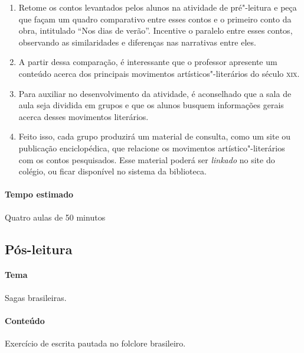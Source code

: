 \documentclass[12pt]{extarticle}
\begin{document}
\begin{enumerate}

\item  Retome os contos levantados pelos alunos na atividade de pré"-leitura e peça que
façam um quadro comparativo entre esses contos e o primeiro conto da obra,
intitulado ``Nos dias de verão''. Incentive o
paralelo entre esses contos, observando as
similaridades e diferenças nas narrativas entre eles.

\item A partir dessa comparação, é interessante que o professor apresente um conteúdo
acerca dos principais movimentos artísticos"-literários do século \textsc{xix}.

\item Para auxiliar no desenvolvimento da
atividade, é aconselhado que a sala de aula seja dividida em grupos e
que os alunos busquem informações gerais acerca desses movimentos literários.

\item Feito
isso, cada grupo produzirá um material de consulta, como um site ou publicação
enciclopédica, que relacione os movimentos artístico"-literários
com os contos pesquisados. Esse material poderá ser \emph{linkado} no site do colégio, ou ficar
disponível no sistema da biblioteca.

\end{enumerate}

\paragraph{Tempo estimado} Quatro aulas de 50 minutos

\subsection{Pós-leitura}


\paragraph{Tema} Sagas brasileiras.

\paragraph{Conteúdo} Exercício de escrita pautada no folclore brasileiro. 
\end{document}
